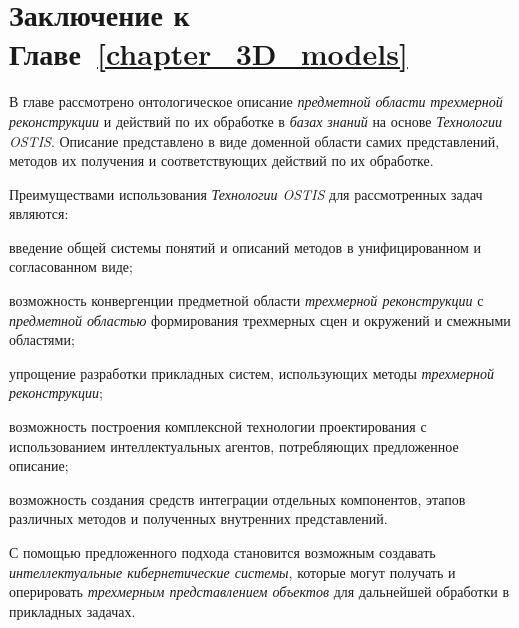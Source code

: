 \section*{Заключение к Главе~\ref{chapter_3D_models}}

В главе рассмотрено онтологическое описание \textit{предметной области} \textit{трехмерной реконструкции} и действий по их обработке в \textit{базах знаний} на основе \textit{Технологии OSTIS}. Описание представлено в виде доменной области самих представлений, методов их получения и соответствующих действий по их обработке.

Преимуществами использования \textit{Технологии OSTIS} для рассмотренных задач являются:

\begin{textitemize}
    \item введение общей системы понятий и описаний методов в унифицированном и согласованном виде;
    \item возможность конвергенции предметной области \textit{трехмерной реконструкции} с \textit{предметной областью} формирования трехмерных сцен и окружений и смежными областями;
    \item упрощение разработки прикладных систем, использующих методы \textit{трехмерной реконструкции};
    \item возможность построения комплексной технологии проектирования с использованием интеллектуальных агентов, потребляющих предложенное описание;
    \item возможность создания средств интеграции отдельных компонентов, этапов различных методов и полученных внутренних представлений.
\end{textitemize}

С помощью предложенного подхода становится возможным создавать \textit{интеллектуальные кибернетические системы}, которые могут получать и оперировать \textit{трехмерным представлением объектов} для дальнейшей обработки в прикладных задачах.
